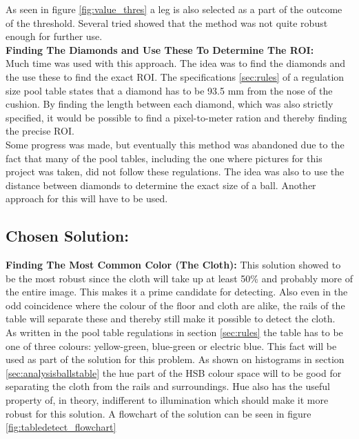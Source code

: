 As seen in figure \ref{fig:value_thres} a leg is also selected as a part of the outcome of the threshold. Several tried showed that the method was not quite robust enough for further use.\\

\textbf{Finding The Diamonds and Use These To Determine The ROI:}\\
Much time was used with this approach. The idea was to find the diamonds and the use these to find the exact ROI. The specifications \ref{sec:rules} of a regulation size pool table states that a diamond has to be 93.5 mm from the nose of the cushion. By finding the length between each diamond, which was also strictly specified, it would be possible to find a pixel-to-meter ration and thereby finding the precise ROI.\\

Some progress was made, but eventually this method was abandoned due to the fact that many of the pool tables, including the one where pictures for this  project was taken, did not follow these regulations. The idea was also to use the distance between diamonds to determine the exact size of a ball. Another approach for this will have to be used.\\

\subsection{Chosen Solution:}

\textbf{Finding The Most Common Color (The Cloth):}
This solution showed to be the most robust since the cloth will take up at least 50\% and probably more of the entire image. This makes it a prime candidate for detecting. Also even in the odd coincidence where the colour of the floor and cloth are alike, the rails of the table will separate these and thereby still make it possible to detect the cloth.\\

As written in the pool table regulations in section \ref{sec:rules} the table has to be one of three colours: yellow-green, blue-green or electric blue. This fact will be used as part of the solution for this problem. As shown on histograms in section \ref{sec:analysisballstable} the hue part of the HSB colour space will to be good for separating the cloth from the rails and surroundings. Hue also has the useful property of, in theory, indifferent to illumination which should make it more robust for this solution. A flowchart of the solution can be seen in figure \ref{fig:tabledetect_flowchart}

